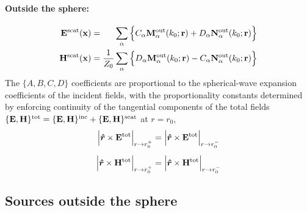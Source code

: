 \documentclass[letterpaper]{article}
\begin{document}
\paragraph{Outside the sphere:} 
\begin{subequations}
\begin{align}
 \vb E\sups{scat}(\vb x)
 &=\hphantom{\frac{1}{Z_0}}  \sum_\alpha 
      \Big\{ C_\alpha \vb M_\alpha\sups{out}(k_0; \vb r)
            +D_\alpha \vb N_\alpha\sups{out}(k_0; \vb r)
      \Big\} 
\\
 \vb H\sups{scat}(\vb x)
 &=  \frac{1}{Z_0} \sum_\alpha 
     \Big\{ D_\alpha \vb M_\alpha\sups{out}(k_0; \vb r)
           -C_\alpha \vb N_\alpha\sups{out}(k_0; \vb r)
     \Big\} 
\end{align}
\label{EHScatOutside}%
\end{subequations}
The $\{A, B, C, D\}$ coefficients are proportional to the 
spherical-wave expansion coefficients of the incident fields,
with the proportionality constants determined by enforcing
continuity of the tangential components of the total 
fields $\{\mathbf{E}, \mathbf{H}\}^{\text{\scriptsize tot}}=
\{\mathbf{E}, \mathbf{H}\}^{\text{\scriptsize inc}}+
\{\mathbf{E}, \mathbf{H}\}^{\text{\scriptsize scat}}$
at $r=r_0$,
\begin{subequations}
\begin{align}
 \Big| \boldsymbol{\hat{r}} \times \mathbf{E}^{\text{\scriptsize tot}} \Big|_{r\to r_0^+}
&=
 \Big| \boldsymbol{\hat{r}} \times \mathbf{E}^{\text{\scriptsize tot}} \Big|_{r\to r_0^-}
\\[5pt]
 \Big| \boldsymbol{\hat{r}} \times \mathbf{H}^{\text{\scriptsize tot}} \Big|_{r\to r_0^+}
&=
 \Big| \boldsymbol{\hat{r}} \times \mathbf{H}^{\text{\scriptsize tot}} \Big|_{r\to r_0^-}
\end{align}
\label{EHMatching}%
\end{subequations}

\subsection{Sources outside the sphere}
\label{SourcesOutsideSection}
\end{document}
